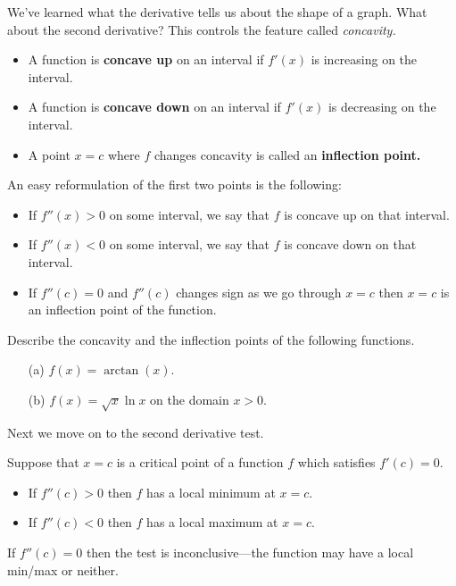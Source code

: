 \documentclass[11pt]{amsart}
\begin{document}
We've learned what the derivative tells us about the shape of a graph. 
What about the second derivative? 
This controls the feature called {\em concavity.}

\begin{itemize} 
\item A function is {\bf concave up} on an interval if $f'(x)$ is increasing on the interval. 
\item A function is {\bf concave down} on an interval if $f'(x)$ is decreasing on the interval. 
\item A point $x = c$ where $f$ changes concavity is called an {\bf inflection point.}
\end{itemize} 

An easy reformulation of the first two points is the following:

\begin{itemize}
\item If $f''(x) > 0$ on some interval, we say that $f$ is concave up on that interval. 
\item If $f''(x) < 0$ on some interval, we say that $f$ is concave down on that interval.
\item If $f''(c) = 0$ and $f''(c)$ changes sign as we go through $x=c$ then $x=c$ is an inflection point of the function. 
\end{itemize} 

\begin{eg}
Describe the concavity and the inflection points of the following functions.
\begin{itemize}
\item[(a)] $f(x) = \arctan(x)$.
\item[(b)] $f(x) = \sqrt{x} \ln x$ on the domain $x > 0$.
\end{itemize}
\end{eg}

\newpage

Next we move on to the second derivative test. 

Suppose that $x=c$ is a critical point of a function $f$ which satisfies $f'(c) = 0$. 
\begin{itemize} 
\item If $f''(c) > 0$ then $f$ has a local minimum at $x=c$. 
\item If $f''(c) < 0$ then $f$ has a local maximum at $x=c$. 
\end{itemize}
If $f''(c) = 0$ then the test is inconclusive---the function may have a local min/max or neither. 
\end{document}
